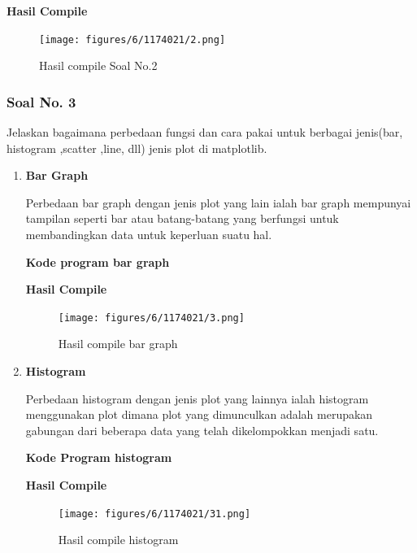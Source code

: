 

\hfill \break
\textbf{Hasil Compile}

\begin{figure}[H]
	\texttt{[image: figures/6/1174021/2.png]}
	\centering
	\caption{Hasil compile Soal No.2}
\end{figure}
 
\subsubsection{Soal No. 3}
\hfill \break
Jelaskan bagaimana perbedaan fungsi dan cara pakai untuk berbagai jenis(bar, histogram ,scatter ,line, dll) jenis plot di matplotlib.

\begin{enumerate}
	\item \textbf{Bar Graph}
	
	Perbedaan bar graph dengan jenis plot yang lain ialah bar graph mempunyai tampilan seperti bar atau batang-batang yang berfungsi untuk membandingkan data untuk keperluan suatu hal.
	
	\textbf{Kode program bar graph}
	
	
	
	\textbf{Hasil Compile}
	
	\begin{figure}[H]
		\texttt{[image: figures/6/1174021/3.png]}
		\centering
		\caption{Hasil compile bar graph}
	\end{figure}
	
	\item \textbf{Histogram}
	
	Perbedaan histogram dengan jenis plot yang lainnya ialah histogram menggunakan plot dimana plot yang dimunculkan adalah merupakan gabungan dari beberapa data yang telah dikelompokkan menjadi satu.
	
	\textbf{Kode Program histogram}
	
	
	
	\textbf{Hasil Compile}
	
	\begin{figure}[H]
		\texttt{[image: figures/6/1174021/31.png]}
		\centering
		\caption{Hasil compile histogram}
	\end{figure}
	

\end{enumerate}
